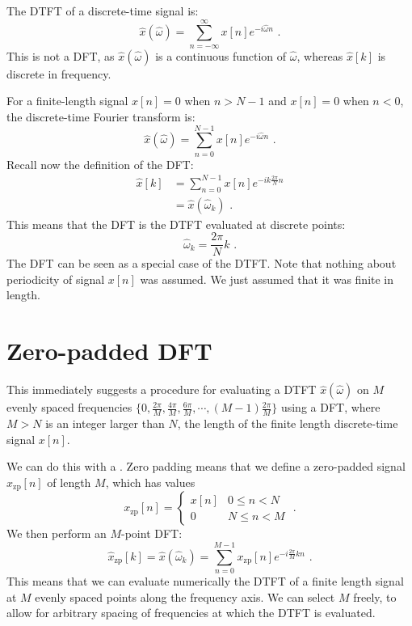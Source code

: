 The DTFT of a discrete-time signal is:
\begin{equation}
  \hat{x}(\hat{\omega}) = \sum_{n=-\infty}^{\infty} x[n] e^{-i\hat{\omega}n} \,\,.
\end{equation}
This is not a DFT, as $\hat{x}(\hat{\omega})$ is a continuous function
of $\hat{\omega}$, whereas $\hat{x}[k]$ is discrete in frequency.

For a finite-length signal $x[n] = 0$ when $n>N-1$ and $x[n] = 0$ when
$n<0$, the discrete-time Fourier transform is:
\begin{equation}
  \hat{x}(\hat{\omega}) = \sum_{n=0}^{N-1} x[n] e^{-i\hat{\omega}n} \,\,.
\end{equation}
Recall now the definition of the DFT:
\begin{align}
  \hat{x}[k] & = \sum_{n=0}^{N-1} x[n] e^{-ik\frac{2\pi}{N}n} \\
             & = \hat{x}(\hat{\omega}_k) \,\,.
\end{align}
This means that the DFT is the DTFT evaluated at discrete points:
\begin{equation}
  \boxed{
    \hat{\omega}_k=\frac{2\pi}{N}k
  } \,\,.
\end{equation}
The DFT can be seen as a special case of the DTFT. Note that nothing
about periodicity of signal $x[n]$ was assumed. We just assumed that
it was finite in length.

\section{Zero-padded DFT}

This immediately suggests a procedure for evaluating a DTFT
$\hat{x}(\hat{\omega})$ on $M$ evenly spaced frequencies
$\{0,\frac{2\pi}{M},\frac{4\pi}{M},\frac{6\pi}{M},\cdots,(M-1)\frac{2\pi}{M}\}$ using a DFT, where
$M>N$ is an integer larger than $N$, the length of the finite length
discrete-time signal $x[n]$.

We can do this with a . Zero padding means that we
define a zero-padded signal $x_{\mathrm{zp}}[n]$ of length $M$, which
has values
\begin{equation}
  x_{\mathrm{zp}}[n]=\left\{ \begin{array}{cc}
    x[n] & 0 \le n < N \\
    0    & N \le n < M
  \end{array}\right. \,\,.
\end{equation}
We then perform an $M$-point DFT:
\begin{equation}
  \boxed{
  \hat{x}_{\mathrm{zp}}[k] = \hat{x}(\hat{\omega}_k) = \sum_{n=0}^{M-1}x_{\mathrm{zp}}[n]e^{-i\frac{2\pi}{M}kn}
  } \,\,.
\end{equation}
This means that we can evaluate numerically the DTFT of a finite
length signal at $M$ evenly spaced points along the frequency axis. We
can select $M$ freely, to allow for arbitrary spacing of frequencies
at which the DTFT is evaluated.

